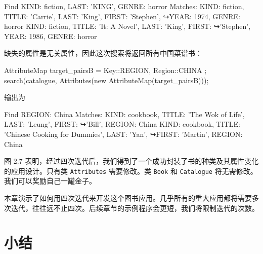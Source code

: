 \begin{codebox}
Find {KIND: fiction, LAST: 'KING', GENRE: horror}
Matches:
  {KIND: fiction, TITLE: 'Carrie', LAST: 'King', FIRST: 'Stephen', 
  ↪YEAR: 1974, GENRE: horror}
  {KIND: fiction, TITLE: 'It: A Novel', LAST: 'King', FIRST: 
  ↪'Stephen', YEAR: 1986, GENRE: horror}
\end{codebox}

缺失的属性是无关属性，因此这次搜索将返回所有中国菜谱书：

\begin{codebox}
    AttributeMap target_pairsB =
    {
        {Key::REGION, Region::CHINA}
    };
    search(catalogue, Attributes(new AttributeMap(target_pairsB)));
\end{codebox}

输出为

\begin{codebox}
Find {REGION: China}
Matches:
  {KIND: cookbook, TITLE: 'The Wok of Life', LAST: 'Leung', FIRST: 
  ↪'Bill', REGION: China}
  {KIND: cookbook, TITLE: 'Chinese Cooking for Dummies', LAST: 'Yan', 
  ↪FIRST: 'Martin', REGION: China}
\end{codebox}

图 2.7 表明，经过四次迭代后，我们得到了一个成功封装了书的种类及其属性变化的应用设计。只有类 \texttt{Attributes} 需要修改。类 \texttt{Book} 和 \texttt{Catalogue} 将无需修改。我们可以奖励自己一罐金子。



本章演示了如何用四次迭代来开发这个图书应用。几乎所有的重大应用都将需要多次迭代，往往远不止四次。后续章节的示例程序会更短，我们将限制迭代的次数。

\section*{小结}

